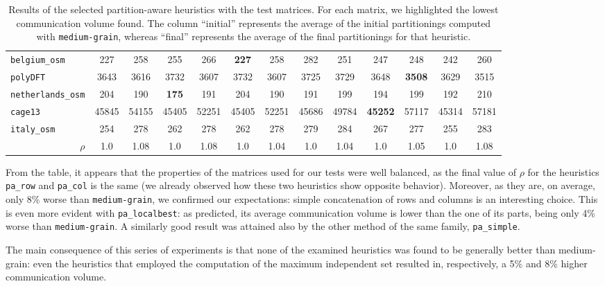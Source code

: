 \begin{table}
\begin{tabular}{|l|c|c||c|c||c|c||c|c||c|c||c|c|}
		\verb|belgium_osm| & 227 & 258 & 255 & 266 & \textbf{227} & 258 &  282 & 251 & 247 & 248 & 242 & 260 \\
		\verb|polyDFT| & 3643 & 3616 & 3732 & 3607 & 3732 &  3607 & 3725 & 3729 & 3648 & \textbf{3508} & 3629 & 3515 \\
		\verb|netherlands_osm| & 204 & 190 & \textbf{175} & 191 & 204 & 190 & 191 & 199 & 194 & 199 & 192 & 210 \\
		\verb|cage13| & 45845 & 54155 & 45405 & 52251 & 45405 & 52251 & 45686 & 49784 & \textbf{45252} & 57117 & 45314 & 57181\\
		\verb|italy_osm| & 254 & 278 & 262 & 278 &262 & 278 & 279 & 284 & 267 & 277 & 255 & 283  \\ \hline
		\multicolumn{1}{|r|}{$\rho$}	& 1.0  & 1.08 & 1.0  & 1.08 & 1.0  & 1.04 & 1.0  & 1.04 & 1.0  & 1.05 & 1.0  & 1.08 \\ \hline
	\end{tabular}
	\caption{Results of the selected partition-aware heuristics with the test matrices. For each matrix, we highlighted the lowest communication volume found. The column ``initial'' represents the average of the initial partitionings computed with \texttt{medium-grain}, whereas ``final'' represents the average of the final partitionings for that heuristic.} \label{tab:final_pa}
\end{table}

From the table, it appears that the properties of the matrices used for our tests were well balanced, as the final value of $\rho$ for the heuristics \verb|pa_row| and \verb|pa_col| is the same (we already observed how these two heuristics show opposite behavior). Moreover, as they are, on average, only 8\% worse than \verb|medium-grain|, we confirmed our expectations: simple concatenation of rows and columns is an interesting choice. This is even more evident with \verb|pa_localbest|: as predicted, its average communication volume is lower than the one of its parts, being only 4\% worse than \verb|medium-grain|. A similarly good result was attained also by the other method of the same family, \verb|pa_simple|.

The main consequence of this series of experiments is that none of the examined heuristics was found to be generally better than medium-grain: even the heuristics that employed the computation of the maximum independent set resulted in, respectively, a 5\% and 8\% higher communication volume. 

